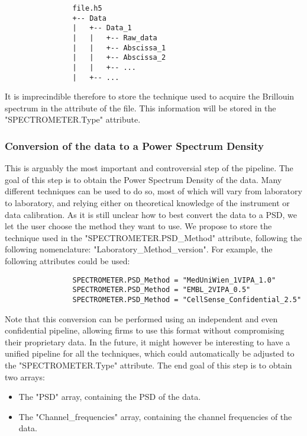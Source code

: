 \documentclass{article}
\begin{document}
            \begin{verbatim}
                file.h5
                +-- Data
                |   +-- Data_1
                |   |   +-- Raw_data
                |   |   +-- Abscissa_1
                |   |   +-- Abscissa_2
                |   |   +-- ...
                |   +-- ...
            \end{verbatim}

            It is imprecindible therefore to store the technique used to acquire the Brillouin spectrum in the attribute of the file. This information will be stored in the "SPECTROMETER.Type" attribute. 
    
        \subsubsection{Conversion of the data to a Power Spectrum Density}

            This is arguably the most important and controversial step of the pipeline. The goal of this step is to obtain the Power Spectrum Density of the data. Many different techniques can be used to do so, most of which will vary from laboratory to laboratory, and relying either on theoretical knowledge of the instrument or data calibration. As it is still unclear how to best convert the data to a PSD, we let the user choose the method they want to use. We propose to store the technique used in the "SPECTROMETER.PSD\_Method" attribute, following the following nomenclature: "Laboratory_Method_version". For example, the following attributes could be used:

            \begin{verbatim}
                SPECTROMETER.PSD_Method = "MedUniWien_1VIPA_1.0"
                SPECTROMETER.PSD_Method = "EMBL_2VIPA_0.5"
                SPECTROMETER.PSD_Method = "CellSense_Confidential_2.5"
            \end{verbatim}

            Note that this conversion can be performed using an independent and even confidential pipeline, allowing firms to use this format without compromising their proprietary data. In the future, it might however be interesting to have a unified pipeline for all the techniques, which could automatically be adjusted to the "SPECTROMETER.Type" attribute. The end goal of this step is to obtain two arrays: 
            \begin{itemize}
                \item The "PSD" array, containing the PSD of the data.
                \item The "Channel\_frequencies" array, containing the channel frequencies of the data.
            \end{itemize}
\end{document}
